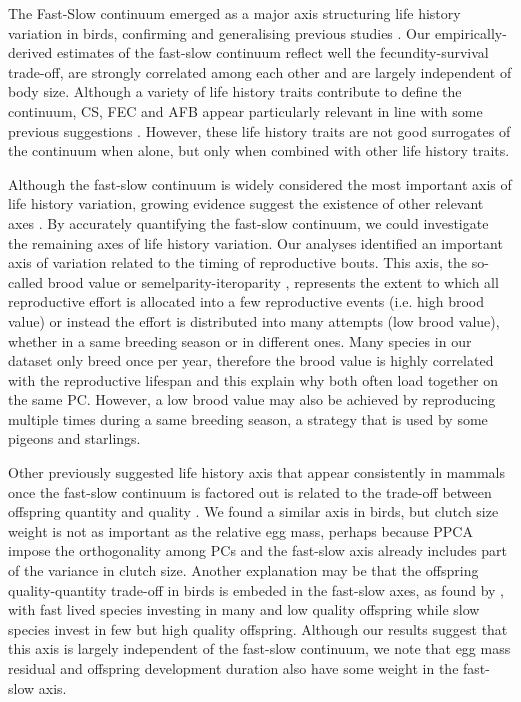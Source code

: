 The Fast-Slow continuum emerged as a major axis structuring life history 
variation in birds, confirming and generalising previous studies
\citep{Saether1987,Gaillard1989,Saether2000,Jeschke2009}.
Our empirically-derived estimates of the fast-slow continuum reflect well the
fecundity-survival trade-off, are strongly correlated among each other and are 
largely independent of body size. Although a variety of life history traits 
contribute to define the continuum, CS, FEC and AFB appear particularly relevant in
line with some previous suggestions
\citep{Stearns1983a,Saether1987,Gaillard1989,Oli2004,Dobson2007,Jeschke2009}.
However, these life history traits are not good surrogates of the continuum
when alone, but only when combined with other life history traits.

Although the fast-slow continuum is widely considered the most important axis of 
life history variation, growing evidence suggest the existence of other relevant 
axes
\citep{Stearns1983a,Read1989,Gaillard1989,Promislow1990,Dobson2007,Bielby2007}.
By accurately quantifying the fast-slow continuum, we could investigate the
remaining axes of life history variation.
Our analyses identified an important axis of variation related to the timing of
reproductive bouts. This axis, the so-called brood value \citep{Bokony2009} or
semelparity-iteroparity \citep{Gaillard1989}, represents the extent to which
all reproductive effort is allocated into a few reproductive events (i.e. high
brood value) or instead the effort is distributed into many attempts (low brood
value), whether in a same breeding season or in different ones. Many species in
our dataset only breed once per year, therefore the brood value is highly
correlated with the reproductive lifespan and this explain why both often load
together on the same PC. However, a low brood value may also be achieved by
reproducing multiple times during a same breeding season, a strategy that is
used by some pigeons and starlings.

Other previously suggested life history axis that appear consistently in mammals
once the fast-slow continuum is factored out is related to the trade-off between
offspring quantity and quality \citep{Promislow1990,Bielby2007,Dobson2007}.
We found a similar axis in birds, but clutch size weight is not as important as
the relative egg mass, perhaps because PPCA impose the orthogonality among PCs
and the fast-slow axis already includes part of the variance in clutch size.
Another explanation may be that the offspring quality-quantity trade-off
in birds is embeded in the fast-slow axes, as found by \citet{Jeschke2009},
with fast lived species investing in many and low quality offspring while slow
species invest in few but high quality offspring. Although our results suggest
that this axis is largely independent of the fast-slow continuum, we note that
egg mass residual and offspring development duration also have some weight in
the fast-slow axis.

